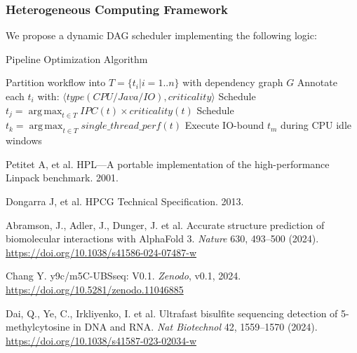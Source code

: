 \documentclass[a4paper,12pt]{article}
\DeclareMathOperator*{\argmax}{arg\,max}  %
\begin{document}
\subsubsection{Heterogeneous Computing Framework}
We propose a dynamic DAG scheduler implementing the following logic:

\begin{algorithm}[H]
\caption{Pipeline Optimization Algorithm}
\begin{algorithmic}[1]
\State Partition workflow into \(T = \{t_i|i=1..n\}\) with dependency graph \(G\)
\State Annotate each \(t_i\) with: \(\langle \mathit{type}(CPU/Java/IO), \mathit{criticality} \rangle\)
        \State Schedule \(t_j = \argmax_{t \in T} \mathit{IPC}(t) \times \mathit{criticality}(t)\)
        \State Schedule \(t_k = \argmax_{t \in T} \mathit{single\_thread\_perf}(t)\)
    \EndIf
    \State Execute IO-bound \(t_m\) during CPU idle windows
\EndWhile
\end{algorithmic}
\end{algorithm}

\newpage

\begin{thebibliography}{9}

Petitet A, et al. HPL—A portable implementation of the high-performance Linpack benchmark. 2001.

Dongarra J, et al. HPCG Technical Specification. 2013.

Abramson, J., Adler, J., Dunger, J. et al. Accurate structure prediction of biomolecular interactions with AlphaFold 3. \textit{Nature} 630, 493–500 (2024). \url{https://doi.org/10.1038/s41586-024-07487-w}

Chang Y. y9c/m5C-UBSseq: V0.1. \textit{Zenodo}, v0.1, 2024. \url{https://doi.org/10.5281/zenodo.11046885}

Dai, Q., Ye, C., Irkliyenko, I. et al. Ultrafast bisulfite sequencing detection of 5-methylcytosine in DNA and RNA. \textit{Nat Biotechnol} 42, 1559–1570 (2024). \url{https://doi.org/10.1038/s41587-023-02034-w}
\end{thebibliography}
\newpage
\end{document}
